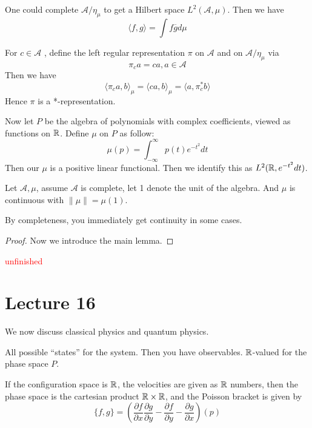 One could complete $\mathcal{A}/\eta_\mu$ to get a Hilbert space $L^2(\mathcal{A},\mu)$. Then we have
\begin{equation*}
    \langle f,g\rangle=\int f\overline{g}d\mu
\end{equation*}

\begin{definition}
    For $c\in\mathcal{A}$ , define the left regular representation $\pi$ on $\mathcal{A}$ and on $\mathcal{A}/\eta_\mu$ via
    \begin{equation*}
        \pi_ca=ca, a\in\mathcal{A}
    \end{equation*}
    Then we have
    \begin{equation*}
        \langle \pi_ca,b\rangle_\mu=\langle ca, b\rangle_\mu=\langle a, \pi_c^*b\rangle
    \end{equation*}
    Hence $\pi$ is a *-representation.
\end{definition}

Now let $P$ be the algebra of polynomials with complex coefficients, viewed as functions on $\mathbb{R}$. Define $\mu$ on $P$ as follow:
\begin{equation*}
    \mu(p)=\int_{-\infty}^\infty p(t)e^{-t^2}dt
\end{equation*}
Then our $\mu$ is a positive linear functional. Then we identify this as $L^2(\mathbb{R}, e^{-t^2}dt)$.

\begin{proposition}
    Let $\mathcal{A},\mu$, assume $\mathcal{A}$ is complete, let 1 denote the unit of the algebra. And $\mu$ is continuous with $\|\mu\|=\mu(1)$.
\end{proposition}
\begin{remark}
    By completeness, you immediately get continuity in some cases.
\end{remark}
\begin{proof}
    Now we introduce the main lemma.
\end{proof}
\textcolor{red}{unfinished}

\section{Lecture 16}
We now discuss classical physics and quantum physics.

All possible ``states'' for the system. Then you have observables. 
$\mathbb{R}$-valued for the phase space $P$. 


If the configuration space is $\mathbb{R}$, the velocities are given as $\mathbb{R}$ numbers, then the phase space is the cartesian product $\mathbb{R}\times\mathbb{R}$, and the Poisson bracket is given by
\begin{equation*}
    \{f,g\}=\left(\frac{\partial f}{\partial x}\frac{\partial g}{\partial y}-\frac{\partial f}{\partial y}-\frac{\partial g}{\partial x}\right)(p)
\end{equation*}

